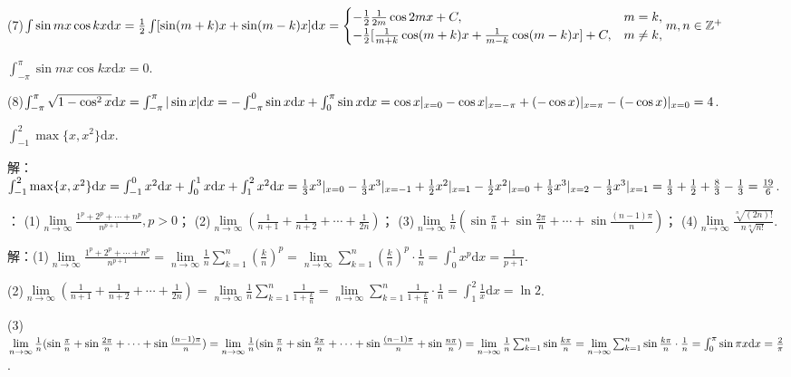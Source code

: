 \documentclass[12pt,UTF8]{ctexart}
\begin{document}
\begin{enumerate}
(7)$\int\sin mx\cos kx\mathrm dx=\frac12\int[\sin(m+k)x+\sin(m-k)x]\mathrm dx\\
=\begin{cases}
-\frac12\frac1{2m}\cos2mx+C,&m=k,\\
-\frac12[\frac1{m+k}\cos(m+k)x+\frac1{m-k}\cos(m-k)x]+C,&m\neq k,
\end{cases}m,n\in\mathbb Z^+$

$\int_{-\pi}^\pi\sin mx\cos kx\mathrm dx=0$.

(8)$\int_{-\pi}^\pi\sqrt{1-\cos^2x}\mathrm dx=\int_{-\pi}^\pi|\sin x|\mathrm dx=-\int_{-\pi}^0\sin x\mathrm dx+\int_0^\pi\sin x\mathrm dx\\
=\cos x|_{x=0}-\cos x|_{x=-\pi}+(-\cos x)|_{x=\pi}-(-\cos x)|_{x=0}=4$.

$\int_{-1}^2\max\{x,x^2\}\mathrm dx$.

解：$\int_{-1}^2\max\{x,x^2\}\mathrm dx=\int_{-1}^0x^2\mathrm dx+\int_0^1x\mathrm dx+\int_1^2x^2\mathrm dx\\
=\frac13x^3|_{x=0}-\frac13x^3|_{x=-1}+\frac12x^2|_{x=1}-\frac12x^2|_{x=0}+\frac13x^3|_{x=2}-\frac13x^3|_{x=1}=\frac13+\frac12+\frac83-\frac13=\frac{19}6$.

：
\newline
(1)$\lim\limits_{n\rightarrow\infty}\frac{1^p+2^p+\cdots+n^p}{n^{p+1}},p>0$；
\newline
(2)$\lim\limits_{n\rightarrow\infty}(\frac1{n+1}+\frac1{n+2}+\cdots+\frac1{2n})$；
\newline
(3)$\lim\limits_{n\rightarrow\infty}\frac1n(\sin\frac\pi n+\sin\frac{2\pi}n+\cdots+\sin\frac{(n-1)\pi}n)$；
\newline
(4)$\lim\limits_{n\rightarrow\infty}\frac{\sqrt[n]{(2n)!}}{n\sqrt[n]{n!}}$.

解：(1)$\lim\limits_{n\rightarrow\infty}\frac{1^p+2^p+\cdots+n^p}{n^{p+1}}=\lim\limits_{n\rightarrow\infty}\frac1n\sum_{k=1}^n(\frac kn)^p=\lim\limits_{n\rightarrow\infty}\sum_{k=1}^n(\frac kn)^p\cdot\frac1n=\int_0^1x^p\mathrm dx=\frac1{p+1}$.

(2)$\lim\limits_{n\rightarrow\infty}(\frac1{n+1}+\frac1{n+2}+\cdots+\frac1{2n})=\lim\limits_{n\rightarrow\infty}\frac1n\sum_{k=1}^n\frac1{1+\frac kn}=\lim\limits_{n\rightarrow\infty}\sum_{k=1}^n\frac1{1+\frac kn}\cdot\frac1n=\int_1^2\frac1x\mathrm dx=\ln2$.

(3)$\lim\limits_{n\rightarrow\infty}\frac1n(\sin\frac\pi n+\sin\frac{2\pi}n+\cdots+\sin\frac{(n-1)\pi}n)=\lim\limits_{n\rightarrow\infty}\frac1n(\sin\frac\pi n+\sin\frac{2\pi}n+\cdots+\sin\frac{(n-1)\pi}n+\sin\frac{n\pi}n)\\
=\lim\limits_{n\rightarrow\infty}\frac1n\sum_{k=1}^n\sin\frac{k\pi}n=\lim\limits_{n\rightarrow\infty}\sum_{k=1}^n\sin\frac{k\pi}n\cdot\frac1n=\int_0^\pi\sin \pi x\mathrm dx=\frac2\pi$.


\end{enumerate}
\end{document}
